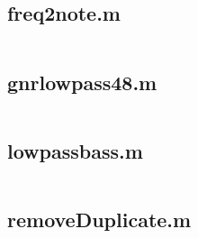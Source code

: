 \documentclass{article}
\begin{document}
\begin{appendices}
\subsection{freq2note.m}
\inputminted{matlab}{freq2note.m}
\subsection{gnrlowpass48.m}
\inputminted{matlab}{gnrlowpass48.m}
\subsection{lowpassbass.m}
\inputminted{matlab}{lowpassbass.m}
\subsection{removeDuplicate.m}
\inputminted{matlab}{removeDuplicate.m}

\end{appendices}
\end{document}
